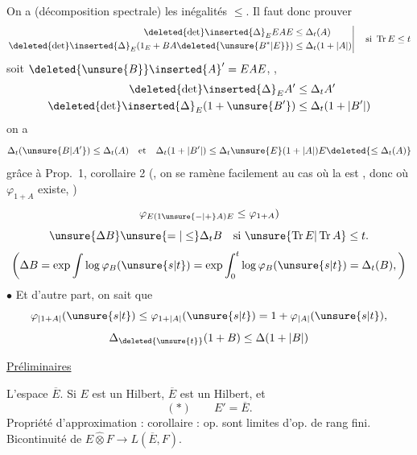 On a (décomposition spectrale) les inégalités $\leq$. Il faut donc prouver
\[
\left.\begin{aligned}
\deleted{\det}\inserted{\Delta}_E EAE&\leq\Delta_t(A)\\
\deleted{\det}\inserted{\Delta}_E(1_E+BA\deleted{\unsure{B^*|E}})&\leq\Delta_t(1+|A|)
\end{aligned}\right|\quad\text{si }\operatorname{Tr}E\leq t
\]
soit $\deleted{\unsure{B}}\inserted{A}'=EAE$,
, \uline{} 
\[
\begin{aligned}
\deleted{\det}\inserted{\Delta}_E A'&\leq\Delta_t A'\\
\deleted{\det}\inserted{\Delta}_E(1+\unsure{B'})&\leq\Delta_t(1+|B'|)
\end{aligned}
\]
on a
\[
\Delta_t(\unsure{B|A'})\leq\Delta_t(A)
\quad\text{et}\quad
\Delta_t(1+|B'|)\leq\Delta_t\unsure{E}(1+|A|)E\deleted{\leq\Delta_t(A)}
\]
grâce à Prop.\ 1, corollaire 2 (, on se ramène facilement au cas où la  est , donc où $\varphi_{1+A}$ existe, )
\[
\varphi_{E(1\unsure{-|+}A)E}\leq\varphi_{1+A})
\]
\deleted{$\det$}
\[
\unsure{\Delta B}\unsure{=|\leq}\Delta_tB
\quad\text{si }\unsure{\operatorname{Tr}E|\operatorname{Tr}A}\leq t.
\]
\[
\left(\Delta B=\exp\int\log\varphi_B(\unsure{s|t})
=\exp\int_0^t\log\varphi_B(\unsure{s|t})=\Delta_t(B),\right)
\]
\noindent$\bullet$ Et d'autre part, on sait que
\[
\varphi_{|1+A|}(\unsure{s|t})\leq\varphi_{1+|A|}(\unsure{s|t})
=1+\varphi_{|A|}(\unsure{s|t}),
\]
\[
\Delta_{\deleted{\unsure{t}}}(1+B)\leq\Delta(1+|B|)
\]


 \uline{Préliminaires}

L'espace $\overline E$. Si $E$ est un Hilbert, $\overline E$ est un Hilbert, et
\[
(*)\qquad \boxed{E'=\overline E}.
\]
Propriété d'approximation : corollaire : op.  sont limites d'op. de rang fini. Bicontinuité de $E\widehat\otimes F\longrightarrow L(\overline E,F)$.

